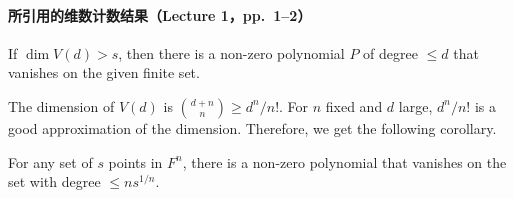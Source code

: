 \paragraph{所引用的维数计数结果（Lecture 1，pp.~1--2）}
\begin{corollary}[0.2]
If $\dim V(d)>s$, then there is a non-zero polynomial $P$ of degree $\leq d$ that vanishes on the given finite set.
\end{corollary}
The dimension of $V(d)$ is $\binom{d+n}{n}\geq d^n/n!$. For $n$ fixed and $d$ large, $d^n/n!$ is a good approximation of the dimension. Therefore, we get the following corollary.
\begin{corollary}[0.3]
For any set of $s$ points in $F^n$, there is a non-zero polynomial that vanishes on the set with degree $\leq ns^{1/n}$.
\end{corollary}

